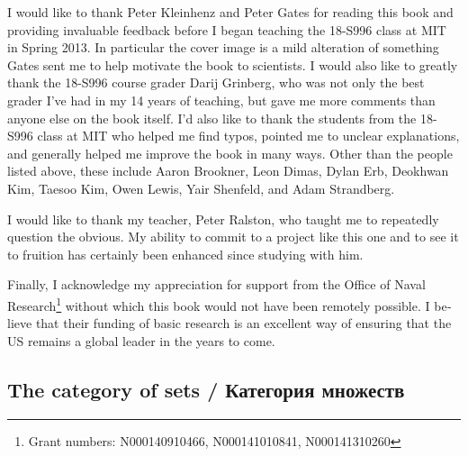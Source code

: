 \documentclass[a4paper]{book}
\theoremstyle{myth}
\begin{document}
\begin{english}
\begin{russian} \end{russian}

I would like to thank Peter Kleinhenz and Peter Gates for reading this book and providing invaluable feedback before I began teaching the 18-S996 class at MIT in Spring 2013. In particular the cover image is a mild alteration of something Gates sent me to help motivate the book to scientists. I would also like to greatly thank the 18-S996 course grader Darij Grinberg, who was not only the best grader I've had in my 14 years of teaching, but gave me more comments than anyone else on the book itself. I'd also like to thank the students from the 18-S996 class at MIT who helped me find typos, pointed me to unclear explanations, and generally helped me improve the book in many ways. Other than the people listed above, these include Aaron Brookner, Leon Dimas, Dylan Erb, Deokhwan Kim, Taesoo Kim, Owen Lewis, Yair Shenfeld, and Adam Strandberg.

\begin{russian} \end{russian}

I would like to thank my teacher, Peter Ralston, who taught me to repeatedly question the obvious. My ability to commit to a project like this one and to see it to fruition has certainly been enhanced since studying with him.

\begin{russian} \end{russian}

Finally, I acknowledge my appreciation for support from the Office of Naval Research\footnote{Grant numbers: N000140910466, N000141010841, N000141310260}
without which this book would not have been remotely possible. I believe that their funding of basic research is an excellent way of ensuring that the US remains a global leader in the years to come.

\begin{russian} \end{russian}



\begin{russian}\chapter{The category of sets / Категория множеств}\label{chap:sets}\end{russian}


\end{english}
\end{document}
